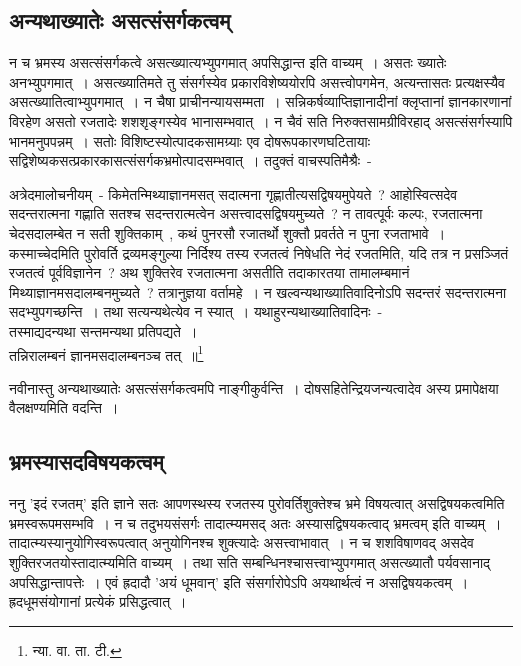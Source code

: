 		\subsection{अन्यथाख्यातेः असत्संसर्गकत्वम्}

		न च भ्रमस्य असत्संसर्गकत्वे असत्ख्यात्यभ्युपगमात् अपसिद्धान्त इति वाच्यम्~। असतः ख्यातेः अनभ्युपगमात्~। असत्ख्यातिमते तु संसर्गस्येव प्रकारविशेष्ययोरपि असत्त्वोपगमेन, अत्यन्तासतः प्रत्यक्षस्यैव असत्ख्यातित्वाभ्युपगमात्~। न चैषा प्राचीनन्यायसम्मता~। सन्निकर्षव्याप्तिज्ञानादीनां क्लृप्तानां ज्ञानकारणानां विरहेण असतो रजतादेः शशशृङ्गस्येव भानासम्भवात्~। न चैवं सति निरुक्तसामग्रीविरहाद् असत्संसर्गस्यापि भानमनुपपन्नम्~। सतोः विशिष्टस्योत्पादकसामग्र्याः एव दोषरूपकारणघटितायाः सद्विशेष्यकसत्प्रकारकासत्संसर्गकभ्रमोत्पादसम्भवात्~। तदुक्तं वाचस्पतिमैश्रैः~-

		{\fontsize{11.7}{0}\selectfont\s अत्रेदमालोचनीयम्~- किमेतन्मिथ्याज्ञानमसत् सदात्मना गृह्णातीत्यसद्विषयमुपेयते~? आहोस्वित्सदेव सदन्तरात्मना गह्णाति सतश्च सदन्तरात्मत्वेन असत्त्वादसद्विषयमुच्यते~? न तावत्पूर्वः कल्पः, रजतात्मना चेदसदालम्बेत न सती शुक्तिकाम्~, कथं पुनरसौ रजातर्थो शुक्तौ प्रवर्तते न पुना रजताभावे~। कस्माच्चेदमिति पुरोवर्ति द्रव्यमङ्गुल्या निर्दिश्य तस्य रजतत्वं निषेधति नेदं रजतमिति, यदि तत्र न प्रसञ्जितं रजतत्वं पूर्वविज्ञानेन~? अथ शुक्तिरेव रजतात्मना असतीति तदाकारतया तामालम्बमानं मिथ्याज्ञानमसदालम्बनमुच्यते~? तत्रानुज्ञया वर्तामहे~। न खल्वन्यथाख्यातिवादिनोऽपि सदन्तरं सदन्तरात्मना सदभ्युपगच्छन्ति~। तथा सत्यन्यथेत्येव न स्यात्~। यथाहुरन्यथाख्यातिवादिनः~-\\ तस्माद्यदन्यथा सन्तमन्यथा प्रतिपद्यते~।\\ तन्निरालम्बनं ज्ञानमसदालम्बनञ्च तत्~॥\footnote{न्या. वा. ता. टी.}}

		नवीनास्तु अन्यथाख्यातेः असत्संसर्गकत्वमपि नाङ्गीकुर्वन्ति~। दोषसहितेन्द्रियजन्यत्वादेव अस्य प्रमापेक्षया वैलक्षण्यमिति वदन्ति~।

		\subsection{भ्रमस्यासदविषयकत्वम्}

		ननु 'इदं रजतम्' इति ज्ञाने सतः आपणस्थस्य रजतस्य पुरोवर्तिशुक्तेश्च भ्रमे विषयत्वात् असद्विषयकत्वमिति भ्रमस्वरूपमसम्भवि~। न च तदुभयसंसर्गः तादात्म्यमसद् अतः अस्यासद्विषयकत्वाद् भ्रमत्वम् इति वाच्यम्~। तादात्म्यस्यानुयोगिस्वरूपत्वात् अनुयोगिनश्च शुक्त्यादेः असत्त्वाभावात्~। न च शशविषाणवद् असदेव शुक्तिरजतयोस्तादात्म्यमिति वाच्यम्~। तथा सति सम्बन्धिनश्चासत्त्वाभ्युपगमात् असत्ख्यातौ पर्यवसानाद् अपसिद्धान्तापत्तेः~। एवं ह्रदादौ 'अयं धूमवान्' इति संसर्गारोपेऽपि अयथार्थत्वं न असद्विषयकत्वम्~। ह्रदधूमसंयोगानां प्रत्येकं प्रसिद्धत्वात्~।

